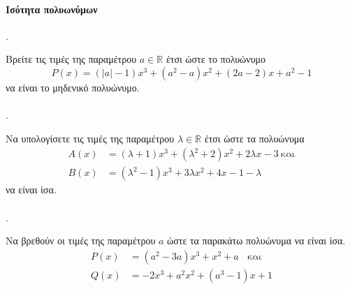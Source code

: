 \documentclass[11pt,a4paper,twocolumn]{article}
\newcounter{askhsh}
\newcommand{\askhsh}{{\large\theaskhsh.}\ \addtocounter{askhsh}{1}}
\begin{document}
\paragraph{Ισότητα πολυωνύμων}
\askhsh Βρείτε τις τιμές της παραμέτρου $a\in\mathbb{R}$ έτσι ώστε το πολυώνυμο
\[ P(x)=(|a|-1)x^3+(a^2-a)x^2+(2a-2)x+a^2-1 \]
να είναι το μηδενικό πολυώνυμο.\\\\
\askhsh Να υπολογίσετε τις τιμές της παραμέτρου $\lambda\in\mathbb{R}$ έτσι ώστε τα πολυώνυμα
\begin{align*}
A(x)&=(\lambda+1)x^3+(\lambda^2+2)x^2+2\lambda x-3\ \text{και}\\
B(x)&=\left(\lambda^2-1\right)x^3+3\lambda x^2 +4x-1-\lambda
\end{align*}
να είναι ίσα.\\\\
\askhsh Να βρεθούν οι τιμές της παραμέτρου $ a $ ώστε τα παρακάτω πολυώνυμα να είναι ίσα.
\begin{align*}
P(x)&=(a^2-3a)x^3+x^2+a
\;\;\textrm{ και }\\Q(x)&=-2x^3+a^2x^2+(a^3-1) x + 1
\end{align*}
\end{document}
